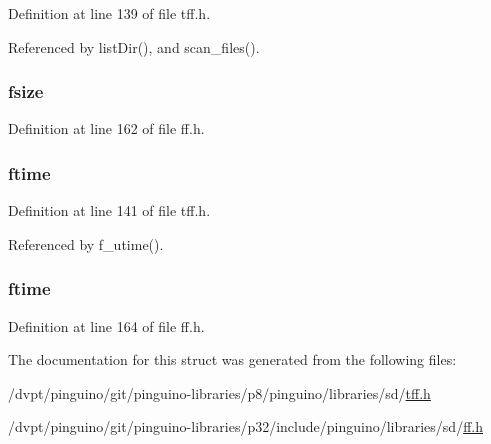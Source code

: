 Definition at line 139 of file tff.\-h.



Referenced by list\-Dir(), and scan\-\_\-files().

\hypertarget{struct_f_i_l_i_n_f_o_af70a0afd16367837984d6205cbfca308}{
\subsubsection[{fsize}]{ fsize}}\label{struct_f_i_l_i_n_f_o_af70a0afd16367837984d6205cbfca308}


Definition at line 162 of file ff.\-h.

\hypertarget{struct_f_i_l_i_n_f_o_a3f6ad56d9c47d7ca879332e034917077}{
\subsubsection[{ftime}]{ ftime}}\label{struct_f_i_l_i_n_f_o_a3f6ad56d9c47d7ca879332e034917077}


Definition at line 141 of file tff.\-h.



Referenced by f\-\_\-utime().

\hypertarget{struct_f_i_l_i_n_f_o_abd08deb420662691dbaced4a4d729923}{
\subsubsection[{ftime}]{ ftime}}\label{struct_f_i_l_i_n_f_o_abd08deb420662691dbaced4a4d729923}


Definition at line 164 of file ff.\-h.



The documentation for this struct was generated from the following files\-:\begin{DoxyCompactItemize}
\item 
/dvpt/pinguino/git/pinguino-\/libraries/p8/pinguino/libraries/sd/\hyperlink{tff_8h}{tff.\-h}\item 
/dvpt/pinguino/git/pinguino-\/libraries/p32/include/pinguino/libraries/sd/\hyperlink{ff_8h}{ff.\-h}\end{DoxyCompactItemize}
